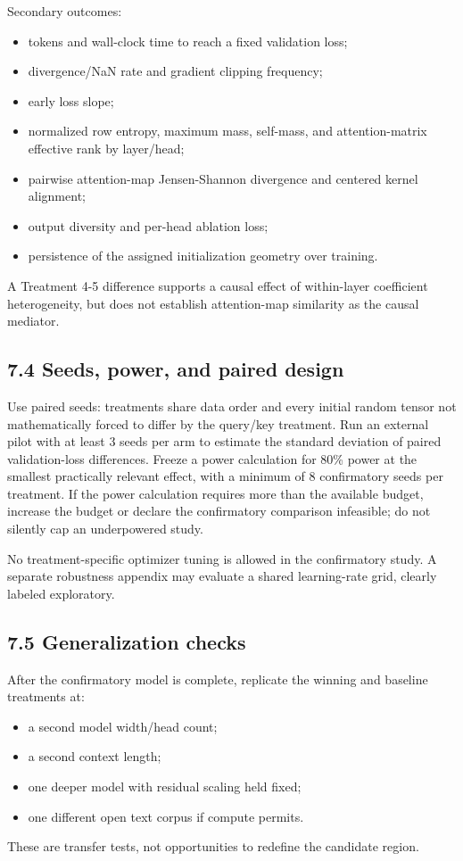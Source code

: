 \documentclass[11pt,letterpaper]{article}
\theoremstyle{definition}
\begin{document}
Secondary outcomes:

\begin{itemize}
  \item tokens and wall-clock time to reach a fixed validation loss;
  \item divergence/NaN rate and gradient clipping frequency;
  \item early loss slope;
  \item normalized row entropy, maximum mass, self-mass, and attention-matrix effective rank by layer/head;
  \item pairwise attention-map Jensen-Shannon divergence and centered kernel alignment;
  \item output diversity and per-head ablation loss;
  \item persistence of the assigned initialization geometry over training.
\end{itemize}
A Treatment 4-5 difference supports a causal effect of within-layer coefficient heterogeneity, but does not establish attention-map similarity as the causal mediator.

\subsection{7.4 Seeds, power, and paired design}
Use paired seeds: treatments share data order and every initial random tensor not mathematically forced to differ by the query/key treatment. Run an external pilot with at least 3 seeds per arm to estimate the standard deviation of paired validation-loss differences. Freeze a power calculation for 80\% power at the smallest practically relevant effect, with a minimum of 8 confirmatory seeds per treatment. If the power calculation requires more than the available budget, increase the budget or declare the confirmatory comparison infeasible; do not silently cap an underpowered study.

No treatment-specific optimizer tuning is allowed in the confirmatory study. A separate robustness appendix may evaluate a shared learning-rate grid, clearly labeled exploratory.

\subsection{7.5 Generalization checks}
After the confirmatory model is complete, replicate the winning and baseline treatments at:

\begin{itemize}
  \item a second model width/head count;
  \item a second context length;
  \item one deeper model with residual scaling held fixed;
  \item one different open text corpus if compute permits.
\end{itemize}
These are transfer tests, not opportunities to redefine the candidate region.
\end{document}

